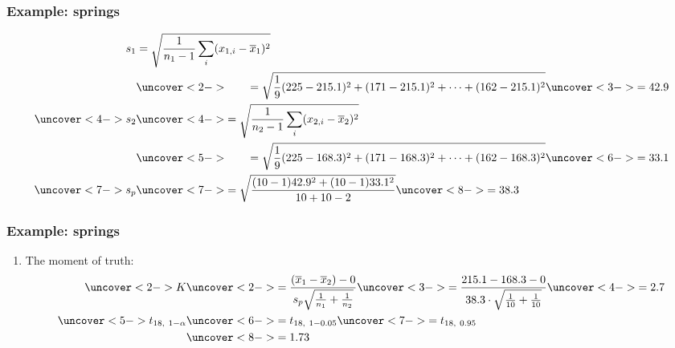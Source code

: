 \documentclass[handout]{beamer}\usepackage{graphicx, color}
\providecommand{\ov}[1]{\overline{#1}}
\numberwithin{equation}{section}
\begin{document}
\begin{frame}
\frametitle{Example: springs} \scriptsize
\begin{align*}
s_1 &= \sqrt{\frac{1}{n_1 - 1} \sum_i (x_{1, i} - \ov{x}_1)^2} \\
&\uncover<2->{ \qquad = \sqrt{\frac{1}{9} (225 - 215.1)^2 + (171 - 215.1)^2 + \cdots + (162 - 215.1)^2}}\uncover<3->{ = 42.9 }\\
\uncover<4->{s_2} & \uncover<4->{= \sqrt{\frac{1}{n_2 - 1} \sum_i (x_{2, i} - \ov{x}_2)^2}}\\
& \uncover<5->{\qquad = \sqrt{\frac{1}{9} (225 - 168.3)^2 + (171 - 168.3)^2 + \cdots + (162 - 168.3)^2}} \uncover<6->{= 33.1}\\
\uncover<7->{s_p} &\uncover<7->{= \sqrt{ \frac{(10-1)42.9^2+ (10-1)33.1^2}{10 + 10 - 2}}} \uncover<8->{= 38.3}
\end{align*}
\end{frame}


\begin{frame}
\frametitle{Example: springs}
\begin{enumerate}[1. ]
 \setcounter{enumi}{\value{saveenum}}
\item The moment of truth:
\begin{align*}
\uncover<2->{K} & \uncover<2->{=  \frac{(\ov{x}_1 - \ov{x}_2) - 0}{s_p \sqrt{\frac{1}{n_1} + \frac{1}{n_2}}}} \uncover<3->{ = \frac{215.1 - 168.3 - 0}{38.3 \cdot \sqrt{\frac{1}{10} + \frac{1}{10}}}} \uncover<4->{= 2.7} \\
\uncover<5->{t_{18, \ 1 - \alpha}} & \uncover<6->{= t_{18, \ 1 - 0.05}}  \uncover<7->{= t_{18, \ 0.95}}  \\
&\uncover<8->{= 1.73}
\end{align*}
\end{enumerate}
\end{frame}
\end{document}
